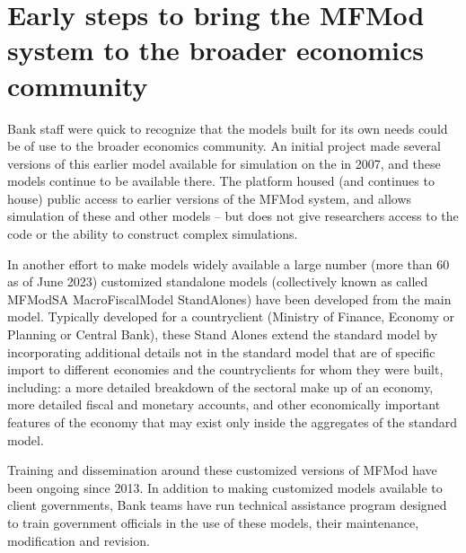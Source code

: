 \documentclass[letterpaper,10pt,english]{jupyterBook}
\begin{document}
\section{Early steps to bring the MFMod system to the broader economics community}
\label{\detokenize{content/01_Introduction/Introduction:early-steps-to-bring-the-mfmod-system-to-the-broader-economics-community}}
\sphinxAtStartPar
Bank staff were quick to recognize that the models built for its own needs could be of use to the broader economics community. An initial project  made several versions of this earlier model available for simulation on the  in 2007, and these models continue to be available there.  The  platform housed (and continues to house) public access to earlier versions of the MFMod system, and allows simulation of these and other models – but does not give researchers access to the code or the ability to construct complex simulations.

\sphinxAtStartPar
In another effort to make models widely available a large number (more than 60 as of June 2023) customized stand\sphinxhyphen{}alone models (collectively known as called MFModSA \sphinxhyphen{} MacroFiscalModel StandAlones)  have been developed from the main model. Typically developed for a country\sphinxhyphen{}client (Ministry of Finance, Economy or Planning or Central Bank), these Stand Alones extend the standard model by incorporating additional details not in the standard model that are of specific import to different economies and the country\sphinxhyphen{}clients for whom they were built, including: a more detailed breakdown of the sectoral make up of an economy, more detailed fiscal and monetary accounts, and other economically important features of the economy that may exist only inside the aggregates of the standard model.

\sphinxAtStartPar
Training and dissemination around these customized versions of MFMod have been ongoing since 2013. In addition to making customized models available to client governments, Bank teams have run technical assistance program designed to train government officials in the use of these models, their maintenance, modification and revision.
\end{document}
